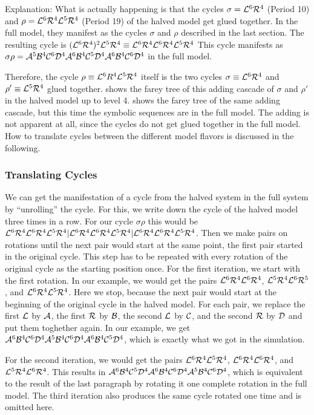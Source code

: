 Explanation: What is actually happening is that the cycles $\sigma = \mathcal{L}^6\mathcal{R}^4$ (Period 10) and $\rho = \mathcal{L}^6\mathcal{R}^4\mathcal{L}^5\mathcal{R}^4$ (Period 19) of the halved model get glued together.
In the full model, they manifest as the cycles $\sigma$ and $\rho$ described in the last section.
The resulting cycle is $(\mathcal{L}^6\mathcal{R}^4)^2\mathcal{L}^5\mathcal{R}^4 \equiv \mathcal{L}^6\mathcal{R}^4\mathcal{L}^6\mathcal{R}^4\mathcal{L}^5\mathcal{R}^4$
This cycle manifests as $\sigma\rho = \mathcal{A}^5\mathcal{B}^4\mathcal{C}^6\mathcal{D}^4\mathcal{A}^6\mathcal{B}^4\mathcal{C}^5\mathcal{D}^4\mathcal{A}^6\mathcal{B}^4\mathcal{C}^6\mathcal{D}^4$ in the full model.

Therefore, the cycle $\rho \equiv \mathcal{L}^6R^4\mathcal{L}^5\mathcal{R}^4$ itself is the two cycles $\sigma \equiv \mathcal{L}^6\mathcal{R}^4$ and $\rho' \equiv \mathcal{L}^5\mathcal{R}^4$ glued together.
 shows the farey tree of this adding cascade of $\sigma$ and $\rho'$ in the halved model up to level 4.
 shows the farey tree of the same adding cascade, but this time the symbolic sequences are in the full model.
The adding is not apparent at all, since the cycles do not get glued together in the full model.
How to translate cycles between the different model flavors is discussed in the following.

\subsubsection{Translating Cycles}

We can get the manifestation of a cycle from the halved system in the full system by ``unrolling'' the cycle.
For this, we write down the cycle of the halved model three times in a row.
For our cycle $\sigma\rho$ this would be $\mathcal{L}^6\mathcal{R}^4\mathcal{L}^6\mathcal{R}^4\mathcal{L}^5\mathcal{R}^4|\mathcal{L}^6\mathcal{R}^4\mathcal{L}^6\mathcal{R}^4\mathcal{L}^5\mathcal{R}^4|\mathcal{L}^6\mathcal{R}^4\mathcal{L}^6\mathcal{R}^4\mathcal{L}^5\mathcal{R}^4$.
Then we make pairs on rotations until the next pair would start at the same point, the first pair started in the original cycle.
This step has to be repeated with every rotation of the original cycle as the starting position once.
For the first iteration, we start with the first rotation.
In our example, we would get the pairs $\mathcal{L}^6\mathcal{R}^4\mathcal{L}^6\mathcal{R}^4$, $\mathcal{L}^5\mathcal{R}^4\mathcal{L}^6\mathcal{R}^5$, and $\mathcal{L}^6\mathcal{R}^4\mathcal{L}^5\mathcal{R}^4$.
Here we stop, because the next pair would start at the beginning of the original cycle in the halved model.
For each pair, we replace the first $\mathcal{L}$ by $\mathcal{A}$, the first $\mathcal{R}$ by $\mathcal{B}$, the second $\mathcal{L}$ by $\mathcal{C}$, and the second $\mathcal{R}$ by $\mathcal{D}$ and put them toghether again.
In our example, we get $\mathcal{A}^6\mathcal{B}^4\mathcal{C}^6\mathcal{D}^4\mathcal{A}^5\mathcal{B}^4\mathcal{C}^6\mathcal{D}^4\mathcal{A}^6\mathcal{B}^4\mathcal{C}^5\mathcal{D}^4$, which is exactly what we got in the simulation.

For the second iteration, we would get the pairs $\mathcal{L}^6\mathcal{R}^4\mathcal{L}^5\mathcal{R}^4$, $\mathcal{L}^6\mathcal{R}^4\mathcal{L}^6\mathcal{R}^4$, and $\mathcal{L}^5\mathcal{R}^4\mathcal{L}^6\mathcal{R}^4$.
This results in $\mathcal{A}^6\mathcal{B}^4\mathcal{C}^5\mathcal{D}^4\mathcal{A}^6\mathcal{B}^4\mathcal{C}^6\mathcal{D}^4\mathcal{A}^5\mathcal{B}^4\mathcal{C}^6\mathcal{D}^4$, which is equivalent to the result of the last paragraph by rotating it one complete rotation in the full model.
The third iteration also produces the same cycle rotated one time and is omitted here.

